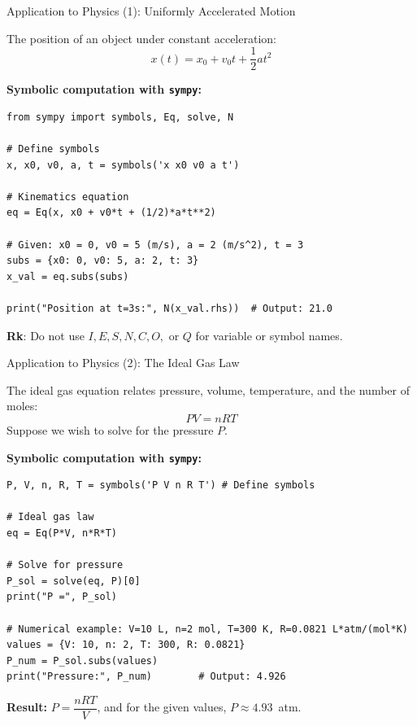 \documentclass[10pt]{beamer}
\begin{document}
\begin{frame}[fragile]{Application to Physics (1): Uniformly Accelerated Motion }

The position of an object under constant acceleration:\vspace{2mm}
\[
x(t) = x_0 + v_0 t + \frac{1}{2} a t^2
\]

\vspace{-1.5mm}
\textbf{Symbolic computation with \texttt{sympy}:}

\begin{lstlisting}[style=mypython]
from sympy import symbols, Eq, solve, N

# Define symbols
x, x0, v0, a, t = symbols('x x0 v0 a t')

# Kinematics equation
eq = Eq(x, x0 + v0*t + (1/2)*a*t**2)

# Given: x0 = 0, v0 = 5 (m/s), a = 2 (m/s^2), t = 3
subs = {x0: 0, v0: 5, a: 2, t: 3}
x_val = eq.subs(subs)

print("Position at t=3s:", N(x_val.rhs))  # Output: 21.0
\end{lstlisting}
\textbf{Rk}: Do not use $I, E, S, N, C, O,$ or $Q$ for variable or symbol names.
\end{frame}

\begin{frame}[fragile]{Application to Physics (2): The Ideal Gas Law}

The ideal gas equation relates pressure, volume, temperature, and the number of moles:
\[
PV = nRT
\]
Suppose we wish to solve for the pressure $P$.

\vspace{0mm}
\textbf{Symbolic computation with \texttt{sympy}:}

\begin{lstlisting}[style=mypython]
P, V, n, R, T = symbols('P V n R T') # Define symbols

# Ideal gas law
eq = Eq(P*V, n*R*T)

# Solve for pressure
P_sol = solve(eq, P)[0]
print("P =", P_sol)

# Numerical example: V=10 L, n=2 mol, T=300 K, R=0.0821 L*atm/(mol*K)
values = {V: 10, n: 2, T: 300, R: 0.0821}
P_num = P_sol.subs(values)
print("Pressure:", P_num)        # Output: 4.926
\end{lstlisting}

\vspace{2mm}
\textbf{Result:} $P = \dfrac{nRT}{V}$, and for the given values, $P \approx 4.93$~atm.
\end{frame}
\end{document}
